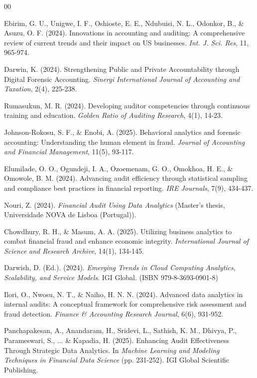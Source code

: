 \documentclass[conference]{IEEEtran}
\begin{document}
\begin{thebibliography}{00}

 Ebirim, G. U., Unigwe, I. F., Oshioste, E. E., Ndubuisi, N. L., Odonkor, B., \& Asuzu, O. F. (2024). Innovations in accounting and auditing: A comprehensive review of current trends and their impact on US businesses. \emph{Int. J. Sci. Res}, 11, 965-974.

 Darwin, K. (2024). Strengthening Public and Private Accountability through Digital Forensic Accounting. \emph{Sinergi International Journal of Accounting and Taxation}, 2(4), 225-238.

 Rumasukun, M. R. (2024). Developing auditor competencies through continuous training and education. \emph{Golden Ratio of Auditing Research}, 4(1), 14-23.

 Johnson-Rokosu, S. F., \& Enobi, A. (2025). Behavioral analytics and forensic accounting: Understanding the human element in fraud. \emph{Journal of Accounting and Financial Management}, 11(5), 93-117.

 Elumilade, O. O., Ogundeji, I. A., Ozoemenam, G. O., Omokhoa, H. E., \& Omowole, B. M. (2024). Advancing audit efficiency through statistical sampling and compliance best practices in financial reporting. \emph{IRE Journals}, 7(9), 434-437.

 Nouri, Z. (2024). \emph{Financial Audit Using Data Analytics} (Master's thesis, Universidade NOVA de Lisboa (Portugal)).

 Chowdhury, R. H., \& Masum, A. A. (2025). Utilizing business analytics to combat financial fraud and enhance economic integrity. \emph{International Journal of Science and Research Archive}, 14(1), 134-145.

 Darwish, D. (Ed.). (2024). \emph{Emerging Trends in Cloud Computing Analytics, Scalability, and Service Models}. IGI Global. (ISBN 979-8-3693-0901-8)

 Ilori, O., Nwosu, N. T., \& Naiho, H. N. N. (2024). Advanced data analytics in internal audits: A conceptual framework for comprehensive risk assessment and fraud detection. \emph{Finance \& Accounting Research Journal}, 6(6), 931-952.

 Panchapakesan, A., Anandaram, H., Sridevi, L., Sathish, K. M., Dhivya, P., Parameswari, S., ... \& Kapadia, H. (2025). Enhancing Audit Effectiveness Through Strategic Data Analytics. In \emph{Machine Learning and Modeling Techniques in Financial Data Science} (pp. 231-252). IGI Global Scientific Publishing.


\end{thebibliography}
\end{document}

